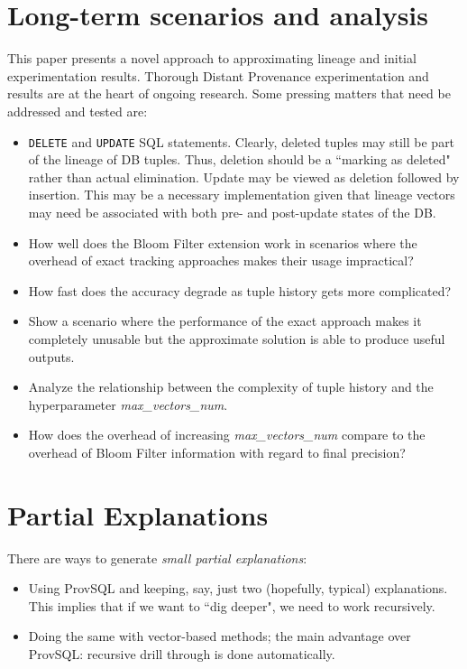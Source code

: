 \section{Long-term scenarios and analysis}
This paper presents a novel approach to approximating lineage and initial experimentation results. Thorough Distant Provenance experimentation and results are at the heart of ongoing research. Some pressing matters that need be addressed and tested are:
\begin{itemize}
    \item \texttt{DELETE} and \texttt{UPDATE} SQL statements. Clearly, deleted tuples may still be part of the lineage of DB tuples. Thus, deletion should be a ``marking as deleted" rather than actual elimination. Update may be viewed as  deletion followed by insertion. This may be a necessary implementation given that lineage vectors may need be associated with both pre- and post-update states of the DB.  
    \item How well does the Bloom Filter extension work in scenarios where the overhead of exact tracking approaches makes their usage impractical?
    \item How fast does the accuracy degrade as tuple history gets more complicated?
    \item Show a scenario where the performance of the exact approach makes it completely unusable but the approximate solution is able to produce useful outputs.
    \item Analyze the relationship between the complexity of tuple history and the hyperparameter \textit{max\_vectors\_num}.
    \item How does the overhead of increasing \textit{max\_vectors\_num} compare to the overhead of Bloom Filter information with regard to final precision?
\end{itemize}

\section{Partial Explanations} 
There are ways to generate \textit{small partial explanations}:
\begin{itemize}
    \item Using ProvSQL and keeping, say, just two (hopefully, typical) explanations. This implies that if we want to ``dig deeper", we need to work recursively.
    \item Doing the same with vector-based methods; the main advantage over ProvSQL: recursive drill through is done automatically.
\end{itemize}

